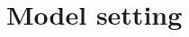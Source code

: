 \documentclass[a4paper,12pt]{article}
\numberwithin{equation}{section}
\begin{document}
%
%
%
%
%
\section{Model setting}\label{sec:model}
\end{document}
